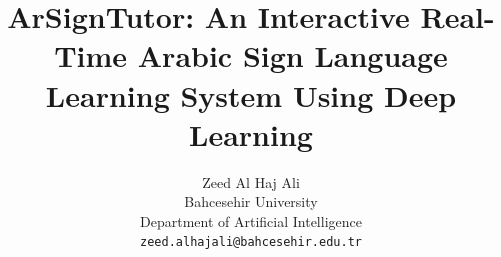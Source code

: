 \documentclass[10pt,twocolumn,letterpaper]{article}
\title{ArSignTutor: An Interactive Real-Time Arabic Sign Language Learning System Using Deep Learning}
\author{Zeed Al Haj Ali\\
Bahcesehir University\\
Department of Artificial Intelligence\\
{\tt\small zeed.alhajali@bahcesehir.edu.tr}
}
\begin{document}
\maketitle








{
    \small
    
    
}
\end{document}
